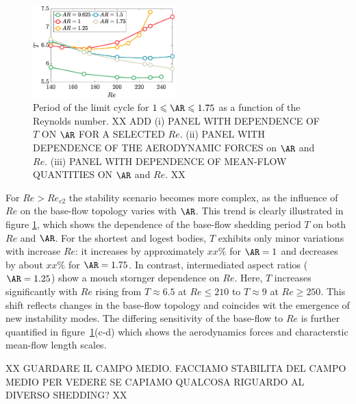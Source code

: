 \begin{figure}
  \centering
  \includegraphics[width=0.49\textwidth]{./fig/AR1s/T_Re.eps}
  \caption{Period of the limit cycle for $1 \le \AR \le 1.75$ as a function of the Reynolds number. XX ADD (i) PANEL WITH DEPENDENCE OF $T$ ON $\AR$ FOR A SELECTED $Re$. (ii) PANEL WITH DEPENDENCE OF THE AERODYNAMIC FORCES on $\AR$ and $Re$. (iii) PANEL WITH DEPENDENCE OF MEAN-FLOW QUANTITIES ON $\AR$ and $Re$. XX}
  \label{fig:T_Re_small}
\end{figure}
%
For $Re>Re_{c2}$ the stability scenario becomes more complex, as the influence of $Re$ on the base-flow topology varies with $\AR$. This trend is clearly illustrated in figure \ref{fig:T_Re_small}, which shows the dependence of the base-flow shedding period $T$ on both $Re$ and $\AR$. For the shortest and logest bodies, $T$ exhibits only minor variations with increase $Re$: it increases by approximately $xx\%$ for $\AR =1$ and decreases by about $xx\%$ for $\AR=1.75$. In contrast, intermediated aspect ratios ($\AR=1.25$) show a mouch stornger dependence on $Re$. Here, $T$ increases significantly with $Re$ rising from $T \approx 6.5$ at $Re \le 210$ to $T \approx 9$ at $Re \ge 250$. This shift reflects changes in the base-flow topology and coincides wit the emergence of new instability modes. The differing sensitivity of the base-flow to $Re$ is further quantified in figure~\ref{fig:T_Re_small}(c-d) which shows the aerodynamics forces and characterstic mean-flow length scales.

XX GUARDARE IL CAMPO MEDIO. FACCIAMO STABILITA DEL CAMPO MEDIO PER VEDERE SE CAPIAMO QUALCOSA RIGUARDO AL DIVERSO SHEDDING? XX



